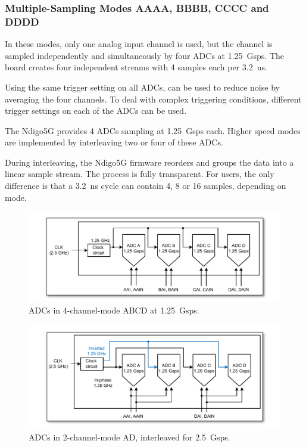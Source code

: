 \subsubsection{Multiple-Sampling Modes AAAA, BBBB, CCCC and DDDD}

In these modes, only one analog input channel is used, but the channel is sampled independently and simultaneously by four ADCs at 1.25~Gsps. The board creates four independent streams with 4 samples each per 3.2~ns.\par
Using the same trigger setting on all ADCs, can be used to reduce noise by averaging the four channels. To deal with complex triggering conditions, different trigger settings on each of the ADCs can be used.\par
The Ndigo5G provides 4 ADCs sampling at 1.25~Gsps each. Higher speed modes are implemented by interleaving two or four of these ADCs.\par
During interleaving, the Ndigo5G firmware reorders and groups the data into a linear sample stream. The process is fully transparent. For users, the only difference is that a 3.2~ns cycle can contain 4, 8 or 16 samples, depending on mode.

\begin{figure}
    \centering
    \includegraphics[width=\textwidth]{figures/4ChannelMode.pdf}
    \caption{ADCs in 4-channel-mode ABCD at 1.25~Gsps.\label{fig:4ChannelMode}}
\end{figure}

\begin{figure}
    \centering
    \includegraphics[width=\textwidth]{figures/2ChannelMode.pdf}
    \caption{ADCs in 2-channel-mode AD, interleaved for 2.5~Gsps.\label{fig:2ChannelMode}}
\end{figure}

